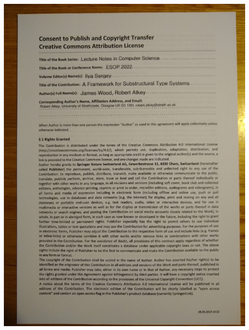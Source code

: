 \documentclass[a4paper]{article}
\begin{document}
\includegraphics[width=0.99\textwidth]{IMG_20220218_100130557.jpg}

\newpage
\end{document}

